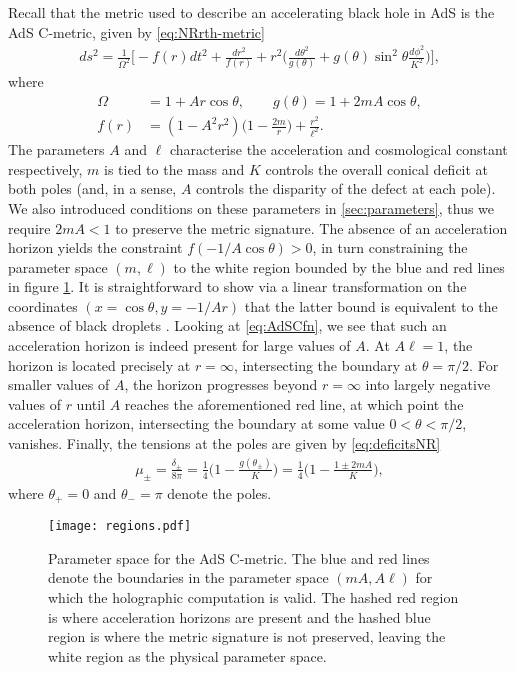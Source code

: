 \documentclass[
twoside,
openright,
frontopenright,
]{dmathesis}
\newcommand{\nn}{\nonumber}
\begin{document}
Recall that the metric used to describe an accelerating black hole in AdS is the
AdS C-metric, given by \eqref{eq:NRrth-metric}
\begin{align}\label{AdSC}
ds^2=\frac{1}{\Omega^2}\bigg[ -f(r)dt^2+\frac{dr^2}{f(r)}
+r^2\Big(\frac{d\theta^2}{g(\theta)}
+g(\theta)\sin^2\theta\frac{d\phi^2}{K^2}\Big)\bigg],
\end{align}
where
\begin{align}
  \label{eq:AdSCfn}
\Omega&=1+Ar\cos\theta, \qquad  g(\theta)= 1+2mA\cos\theta, \nn\\
f(r)&=(1-A^2r^2)\bigg(1-\frac{2m}{r}\bigg)+\frac{r^2}{\ell^2}.
\end{align}
The parameters $A$ and $\ell$ characterise the acceleration and cosmological
constant respectively, $m$ is tied to the mass and $K$ controls the overall
conical deficit at both poles (and, in a sense, $A$ controls the disparity of
the defect at each pole). We also introduced conditions on these parameters in
\cref{sec:parameters}, thus we require $2mA<1$ to preserve the metric
signature. The absence of an acceleration horizon yields the constraint
$f(-1/A\cos\theta) > 0$, in turn constraining the parameter space $(m,\ell)$ to
the white region bounded by the blue and red lines in figure \ref{fig:f1}. It is
straightforward to show via a linear transformation \cite{Hong:2003gx} on the
coordinates $(x=\cos\theta,y=-1/Ar)$ that the latter bound is equivalent to the
absence of black droplets \cite{Hubeny:2009kz}. Looking at \cref{eq:AdSCfn}, we
see that such an acceleration horizon is indeed present for large values of
$A$. At $A\ell=1$, the horizon is located precisely at $r=\infty$, intersecting
the boundary at $\theta=\pi/2$. For smaller values of $A$, the horizon
progresses beyond $r=\infty$ into largely negative values of $r$ until $A$
reaches the aforementioned red line, at which point the acceleration horizon,
intersecting the boundary at some value $0<\theta<\pi/2$, vanishes. Finally, the
tensions at the poles are given by \eqref{eq:deficitsNR}
\begin{align}
\label{mueq}
\mu_{\pm}=\frac{\delta_\pm}{8\pi}
=\frac{1}{4}\Big(1-\frac{g(\theta_\pm)}{K}%
\Big)=\frac{1}{4}\Big(1-\frac{1\pm 2mA}{K}\Big),
\end{align}
where $\theta_+=0$ and $\theta_-=\pi$ denote the poles.
\begin{figure}
\centering
\texttt{[image: regions.pdf]}
\caption{Parameter space for the AdS C-metric. The blue and red lines denote the
  boundaries in the parameter space $(mA,A\ell)$ for which the holographic
  computation is valid.  The hashed red region is where acceleration horizons
  are present and the hashed blue region is where the metric signature is not
  preserved, leaving the white region as the physical parameter space.}
\label{fig:f1}
\end{figure}
\end{document}
